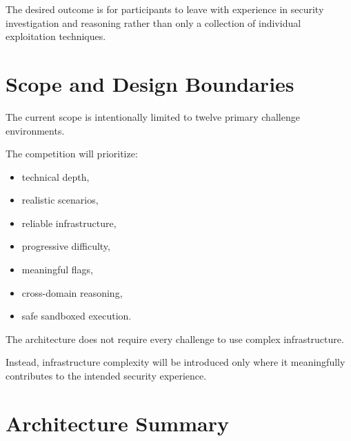 \documentclass[11pt,a4paper]{article}
\begin{document}
The desired outcome is for participants to leave with experience in
security investigation and reasoning rather than only a collection of
individual exploitation techniques.



\section{Scope and Design Boundaries}

The current scope is intentionally limited to twelve primary
challenge environments.

The competition will prioritize:

\begin{itemize}

    \item technical depth,

    \item realistic scenarios,

    \item reliable infrastructure,

    \item progressive difficulty,

    \item meaningful flags,

    \item cross-domain reasoning,

    \item safe sandboxed execution.

\end{itemize}

The architecture does not require every challenge to use complex
infrastructure.

Instead, infrastructure complexity will be introduced only where it
meaningfully contributes to the intended security experience.



\section{Architecture Summary}
\end{document}
